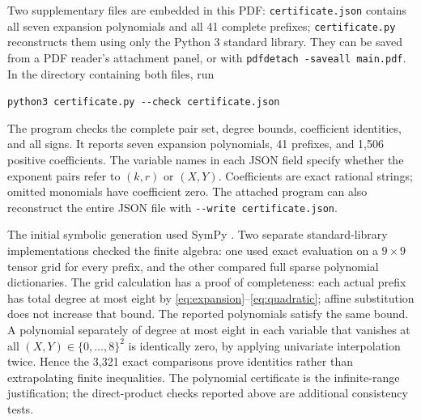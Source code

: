 \documentclass[11pt]{article}
\begin{document}
Two supplementary files are embedded in this PDF: \texttt{certificate.json}
contains all seven expansion polynomials and all 41 complete prefixes;
\texttt{certificate.py} reconstructs them using only the Python 3 standard
library. They can be saved from a PDF reader's attachment panel, or with
\texttt{pdfdetach -saveall main.pdf}. In the directory containing both files,
run
\begin{center}
\verb|python3 certificate.py --check certificate.json|
\end{center}
The program checks the complete pair set, degree bounds, coefficient
identities, and all signs. It reports seven expansion polynomials,
41 prefixes, and 1,506 positive coefficients. The variable names in each
JSON field specify whether the exponent pairs refer to $(k,r)$ or
$(X,Y)$. Coefficients are exact rational strings; omitted monomials have
coefficient zero. The attached program can also reconstruct the entire
JSON file with \verb|--write certificate.json|.

The initial symbolic generation used SymPy \cite{Meurer2017}. Two separate
standard-library implementations checked the finite algebra: one used
exact evaluation on a $9\times9$ tensor grid for every prefix, and the
other compared full sparse polynomial dictionaries. The grid calculation
has a proof of completeness: each actual prefix has total degree at most
eight by \eqref{eq:expansion}--\eqref{eq:quadratic}; affine substitution
does not increase that bound. The reported polynomials satisfy the same
bound. A polynomial separately of degree at most eight in each variable
that vanishes at all $(X,Y)\in\{0,\ldots,8\}^2$ is identically zero,
by applying univariate interpolation twice. Hence the 3,321 exact
comparisons prove identities rather than extrapolating finite inequalities.
The polynomial certificate is the infinite-range justification; the
direct-product checks reported above are additional consistency tests.
\end{document}
